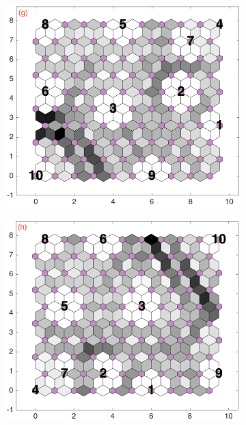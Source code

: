 \begin{figure}
\begin{subfigure}[b]{0.25\textwidth}
        \label{fig: col3and16_dist}
    \end{subfigure}
        \hfill
    \begin{subfigure}[b]{0.25\textwidth}
        \centering
        \includegraphics[width=\textwidth]{../../images0.01/M31/2D/diff_dimension/combine_2D_data_between_cols3and17.png}
        \label{fig: col3and17_dist}
    \end{subfigure}
        \hfill
    \begin{subfigure}[b]{0.25\textwidth}
        \centering
        \includegraphics[width=\textwidth]{../../images0.01/M31/2D/diff_dimension/combine_2D_data_between_cols3and18.png}

\end{subfigure}
\end{figure}
